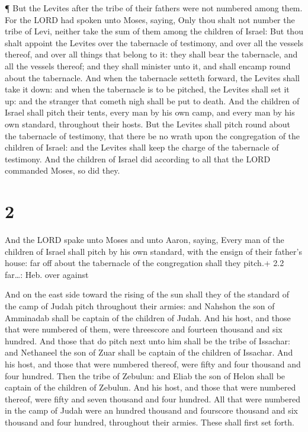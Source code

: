  ¶ But the Levites after the tribe of their fathers were
not numbered among them.  For the LORD had spoken unto
Moses, saying,  Only thou shalt not number the tribe of
Levi, neither take the sum of them among the children of Israel:
 But thou shalt appoint the Levites over the tabernacle of
testimony, and over all the vessels thereof, and over all things that
belong to it: they shall bear the tabernacle, and all the vessels
thereof; and they shall minister unto it, and shall encamp round about
the tabernacle.  And when the tabernacle setteth forward,
the Levites shall take it down: and when the tabernacle is to be
pitched, the Levites shall set it up: and the stranger that cometh nigh
shall be put to death.  And the children of Israel shall
pitch their tents, every man by his own camp, and every man by his own
standard, throughout their hosts.  But the Levites shall
pitch round about the tabernacle of testimony, that there be no wrath
upon the congregation of the children of Israel: and the Levites shall
keep the charge of the tabernacle of testimony.  And the
children of Israel did according to all that the LORD commanded Moses,
so did they.

\hypertarget{section-1}{%
\section{2}\label{section-1}}

 And the LORD spake unto Moses and unto Aaron, saying,
 Every man of the children of Israel shall pitch by his own
standard, with the ensign of their father's house: far off about the
tabernacle of the congregation shall they pitch.+ 2.2 far\ldots: Heb.
over against

 And on the east side toward the rising of the sun shall
they of the standard of the camp of Judah pitch throughout their armies:
and Nahshon the son of Amminadab shall be captain of the children of
Judah.  And his host, and those that were numbered of them,
were threescore and fourteen thousand and six hundred.  And
those that do pitch next unto him shall be the tribe of Issachar: and
Nethaneel the son of Zuar shall be captain of the children of Issachar.
 And his host, and those that were numbered thereof, were
fifty and four thousand and four hundred.  Then the tribe of
Zebulun: and Eliab the son of Helon shall be captain of the children of
Zebulun.  And his host, and those that were numbered
thereof, were fifty and seven thousand and four hundred. 
All that were numbered in the camp of Judah were an hundred thousand and
fourscore thousand and six thousand and four hundred, throughout their
armies. These shall first set forth.

